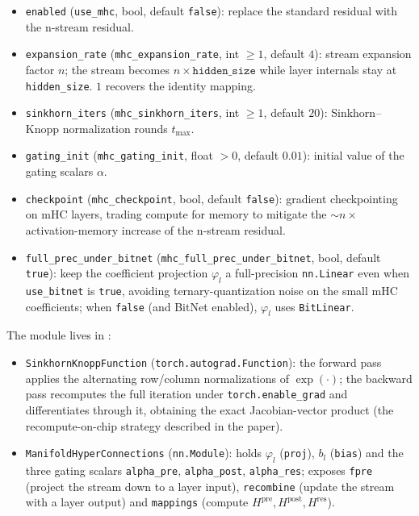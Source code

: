 \begin{itemize}[leftmargin=*]
    \item \texttt{enabled} (\texttt{use\_mhc}, bool, default \texttt{false}):
        replace the standard residual with the n-stream residual.
    \item \texttt{expansion\_rate} (\texttt{mhc\_expansion\_rate}, int $\ge 1$,
        default $4$): stream expansion factor $n$; the stream becomes
        $n \times \texttt{hidden\_size}$ while layer internals stay at
        \texttt{hidden\_size}. $1$ recovers the identity mapping.
    \item \texttt{sinkhorn\_iters} (\texttt{mhc\_sinkhorn\_iters}, int $\ge 1$,
        default $20$): Sinkhorn--Knopp normalization rounds $t_{\max}$.
    \item \texttt{gating\_init} (\texttt{mhc\_gating\_init}, float $> 0$,
        default $0.01$): initial value of the gating scalars $\alpha$.
    \item \texttt{checkpoint} (\texttt{mhc\_checkpoint}, bool, default
        \texttt{false}): gradient checkpointing on mHC layers, trading compute
        for memory to mitigate the $\sim n{\times}$ activation-memory increase
        of the n-stream residual.
    \item \texttt{full\_prec\_under\_bitnet}
        (\texttt{mhc\_full\_prec\_under\_bitnet}, bool, default
        \texttt{true}): keep the coefficient projection $\varphi_l$ a
        full-precision \texttt{nn.Linear} even when \texttt{use\_bitnet} is
        \texttt{true}, avoiding ternary-quantization noise on the small mHC
        coefficients; when \texttt{false} (and BitNet enabled), $\varphi_l$
        uses \texttt{BitLinear}.
\end{itemize}

The module lives in :
\begin{itemize}[leftmargin=*]
    \item \texttt{Sinkhorn\-Knopp\-Function} (\texttt{torch.autograd.Function}):
        the forward pass applies the alternating row/column normalizations of
        $\exp(\cdot)$; the backward pass recomputes the full iteration under
        \texttt{torch.enable\_grad} and differentiates through it, obtaining
        the exact Jacobian-vector product (the recompute-on-chip strategy
        described in the paper).
    \item \texttt{ManifoldHyperConnections} (\texttt{nn.Module}): holds
        $\varphi_l$ (\texttt{proj}), $b_l$ (\texttt{bias}) and the three gating
        scalars \texttt{alpha\_pre}, \texttt{alpha\_post},
        \texttt{alpha\_res}; exposes \texttt{fpre} (project the stream down to
        a layer input), \texttt{recombine} (update the stream with a layer
        output) and \texttt{mappings} (compute $H^{\text{pre}}, H^{\text{post}},
        H^{\text{res}}$).
\end{itemize}

